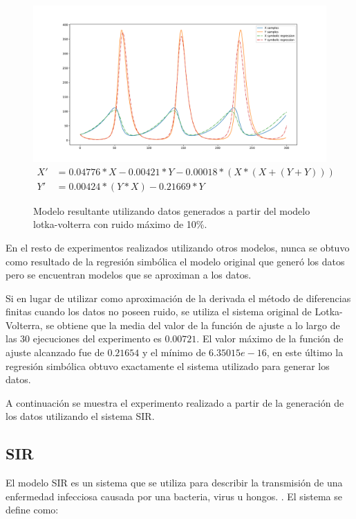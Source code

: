 \begin{figure}[h]
    \centering
    \includegraphics[width=\textwidth]{"figures/final_plot_LV_0.1.pdf"}
    \begin{align*}
        X' & = 0.04776 * X -0.00421 * Y -0.00018 * (X * (X + (Y + Y))) \\
        Y' & = 0.00424 * (Y * X) -0.21669 * Y
    \end{align*}
    \caption{Modelo resultante utilizando datos generados a partir del modelo lotka-volterra con ruido máximo de 10\%.}
    \label{fig:final_plot_LV_0.1}
\end{figure}


En el resto de experimentos realizados utilizando otros modelos, nunca se obtuvo como resultado de la regresión simbólica el modelo original que generó los datos pero se encuentran modelos que se aproximan a los datos.

Si en lugar de utilizar como aproximación de la derivada el método de diferencias finitas cuando los datos no poseen ruido, se utiliza el sistema original de Lotka-Volterra, se obtiene que la media del valor de la función de ajuste a lo largo de las 30 ejecuciones del experimento es $0.00721$. El valor máximo de la función de ajuste alcanzado fue de $0.21654$ y el mínimo de $6.35015e-16$, en este último la regresión simbólica obtuvo exactamente el sistema utilizado para generar los datos.


A continuación se muestra el experimento realizado a partir de la generación de los datos utilizando el sistema SIR.

\subsection{SIR}

El modelo SIR es un sistema que se utiliza para describir la transmisión de una enfermedad infecciosa causada por una bacteria, virus u hongos. \cite{weiss2013sir}. El sistema se define como:

